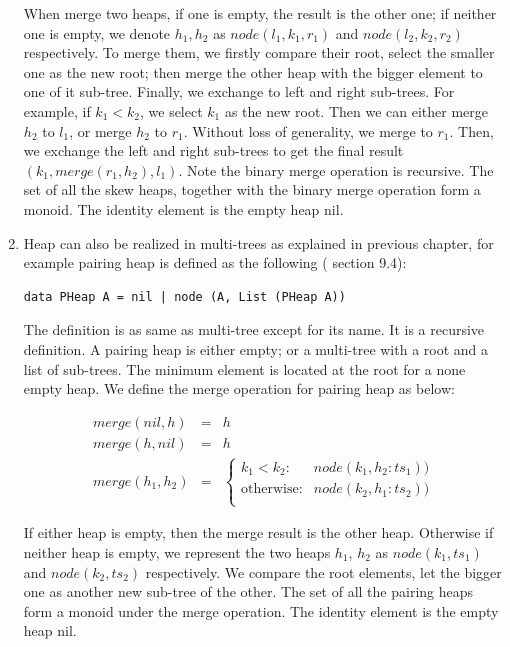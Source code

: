 \documentclass{article}
\begin{document}
\begin{enumerate}
When merge two heaps, if one is empty, the result is the other one; if neither one is empty, we denote $h_1, h_2$ as $node(l_1, k_1, r_1)$ and $node(l_2, k_2, r_2)$ respectively. To merge them, we firstly compare their root, select the smaller one as the new root; then merge the other heap with the bigger element to one of it sub-tree. Finally, we exchange to left and right sub-trees. For example, if $k_1 < k_2$, we select $k_1$ as the new root. Then we can either merge $h_2$ to $l_1$, or merge $h_2$ to $r_1$. Without loss of generality, we merge to $r_1$. Then, we exchange the left and right sub-trees to get the final result $(k_1, merge(r_1, h_2), l_1)$. Note the binary merge operation is recursive. The set of all the skew heaps, together with the binary merge operation form a monoid. The identity element is the empty heap nil.

\item Heap can also be realized in multi-trees as explained in previous chapter, for example pairing heap is defined as the following (\cite{LiuXinyu2017} section 9.4):

\begin{lstlisting}
data PHeap A = nil | node (A, List (PHeap A))
\end{lstlisting}

The definition is as same as multi-tree except for its name. It is a recursive definition. A pairing heap is either empty; or a multi-tree with a root and a list of sub-trees. The minimum element is located at the root for a none empty heap. We define the merge operation for pairing heap as below:

\[
\begin{array}{rcl}
merge(nil, h) & = & h \\
merge(h, nil) & = & h \\
merge(h_1, h_2) & = &
  \begin{cases}
  k_1 < k_2 : & node(k_1, h_2 : ts_1)) \\
  \text{otherwise} : & node(k_2, h_1 : ts_2)) \\
  \end{cases}
\end{array}
\]

If either heap is empty, then the merge result is the other heap. Otherwise if neither heap is empty, we represent the two heaps $h_1$, $h_2$ as $node(k_1, ts_1)$ and $node(k_2, ts_2)$ respectively. We compare the root elements, let the bigger one as another new sub-tree of the other. The set of all the pairing heaps form a monoid under the merge operation. The identity element is the empty heap nil.

\end{enumerate}
\end{document}
